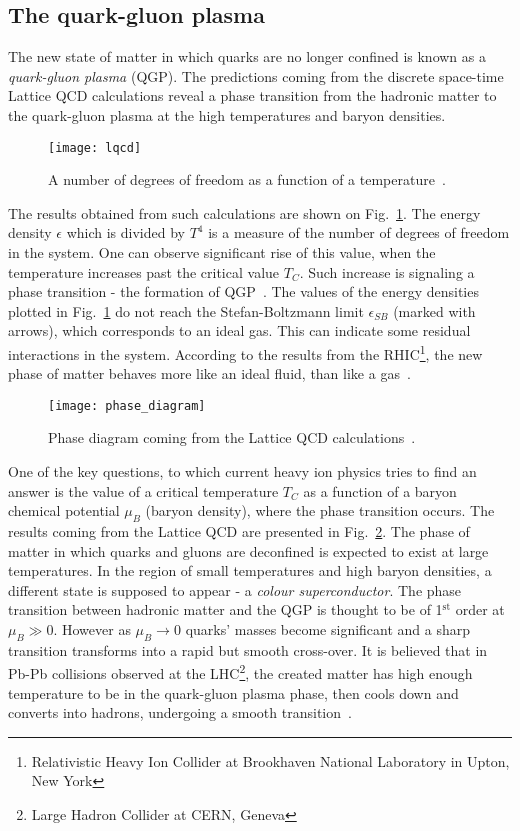     \subsection{The quark-gluon plasma}
      The new state of matter in which quarks are no longer confined is known as a \textit{quark-gluon plasma} (QGP).
      The predictions coming from the discrete space-time Lattice QCD calculations reveal a phase transition from the hadronic matter to the quark-gluon plasma at the high temperatures and baryon densities.
      \begin{figure}[b]
        \centering
        \texttt{[image: lqcd]}
        \caption{A number of degrees of freedom as a function of a temperature~\cite{karsch}.}
        \label{fig:lqcd}
      \end{figure}
      The results obtained from such calculations are shown on Fig.~\ref{fig:lqcd}.
      The energy density $\epsilon$ which is divided by $T^4$ is a measure of the number of degrees of freedom in the system.
      One can observe significant rise of this value, when the temperature increases past the critical value $T_C$.
      Such increase is signaling a phase transition - the formation of QGP~\cite{drkisiel}.
      The values of the energy densities plotted in Fig.~\ref{fig:lqcd} do not reach the Stefan-Boltzmann limit $\epsilon_{SB}$ (marked with arrows), which corresponds to an ideal gas.
      This can indicate some residual interactions in the system.
      According to the results from the RHIC\footnote{Relativistic Heavy Ion Collider at Brookhaven National Laboratory in Upton, New York}, the new phase of matter behaves more like an ideal fluid, than like a gas~\cite{bartke}.
      \begin{figure}[t]
        \centering
        \texttt{[image: phase\_diagram]}
        \caption{Phase diagram coming from the Lattice QCD calculations~\cite{drkisiel}.}
        \label{fig:phase_diagram}
      \end{figure}

      One of the key questions, to which current heavy ion physics tries to find an answer is the value of a critical temperature $T_C$ as a function of a baryon chemical potential $\mu_B$ (baryon density), where the phase transition occurs.
      The results coming from the Lattice QCD are presented in Fig.~\ref{fig:phase_diagram}.
      The phase of matter in which quarks and gluons are deconfined is expected to exist at large temperatures.
      In the region of small temperatures and high baryon densities, a different state is supposed to appear - a \textit{colour superconductor}.
      The phase transition between hadronic matter and the QGP is thought to be of 1$^\text{st}$ order at $\mu_B \gg 0$.
      However as $\mu_B \to 0$ quarks' masses become significant and a sharp transition transforms into a rapid but smooth cross-over.
      It is believed that in Pb-Pb collisions observed at the LHC\footnote{Large Hadron Collider at CERN, Geneva}, the created matter has high enough temperature to be in the quark-gluon plasma phase, then cools down and converts into hadrons, undergoing a smooth transition~\cite{drkisiel}.
